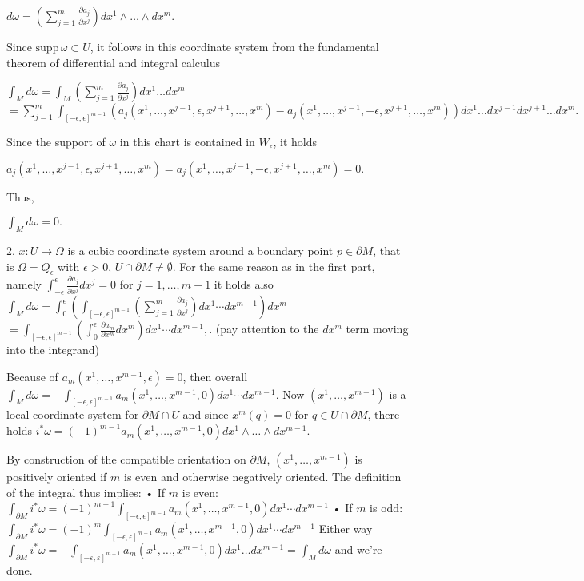 \(d\omega = \left( \sum_{j=1}^m \frac{\partial a_j}{\partial x^j} \right) dx^1 \wedge \dots \wedge dx^m. \)

Since \(\text{supp} \, \omega \subset U\), it follows in this coordinate system from the fundamental theorem of differential and integral calculus

\(\int_M d\omega = \int_M \left( \sum_{j=1}^m \frac{\partial a_j}{\partial x^j} \right) dx^1 \dots dx^m \)
\(= \sum_{j=1}^m \int_{[- \epsilon, \epsilon]^{m-1}} (a_j(x^1, \dots, x^{j-1}, \epsilon, x^{j+1}, \dots, x^m) - a_j(x^1, \dots, x^{j-1}, -\epsilon, x^{j+1}, \dots, x^m)) dx^1 \dots dx^{j-1} dx^{j+1} \dots dx^m. \)

Since the support of \(\omega\) in this chart is contained in \(W_\epsilon\), it holds

\(a_j(x^1, \dots, x^{j-1}, \epsilon, x^{j+1}, \dots, x^m) = a_j(x^1, \dots, x^{j-1}, -\epsilon, x^{j+1}, \dots, x^m) = 0.\)

Thus,

\(\int_M d\omega = 0.\)

2. 
\(x: U \to \Omega\) is a cubic coordinate system around a boundary point \(p \in \partial M\), 
that is \(\Omega = Q_\epsilon\) with \(\epsilon > 0\), \(U \cap \partial M \neq \emptyset\). 
For the same reason as in the first part, namely
\(\int_{-\epsilon}^\epsilon \frac{\partial a_j}{\partial x^j} dx^j = 0\)
for \(j = 1, \dots, m-1\)
it holds also
\(\int_{M} d\omega = \int_0^\epsilon \left( \int_{[-\epsilon, \epsilon]^{m-1}} \left( \sum_{j=1}^m \frac{\partial a_j}{\partial x^j} \right) dx^1 \dotsm dx^{m-1} \right) dx^m \)
\(= \int_{[-\epsilon, \epsilon]^{m-1}} \left( \int_0^\epsilon \frac{\partial a_m}{\partial x^m} dx^m \right) dx^1 \dotsm dx^{m-1}, \).
(pay attention to the \(dx^m\) term moving into the integrand)


Because of \(a_m(x^1, \dots, x^{m-1}, \epsilon) = 0\), then overall
\(\int_M d\omega = -\int_{[-\epsilon, \epsilon]^{m-1}} a_m(x^1, \dots, x^{m-1}, 0) dx^1 \dotsm dx^{m-1}.\)
Now \((x^1, \dots, x^{m-1})\) is a local coordinate system for \(\partial M \cap U\) and since \(x^m(q) = 0\) for \(q \in U \cap \partial M\), there holds
\(i^* \omega = (-1)^{m-1} a_m (x^1, \dots, x^{m-1}, 0) dx^1 \wedge \dots \wedge dx^{m-1}.\)

By construction of the compatible orientation on \(\partial M\), \((x^1, \dots, x^{m-1})\) is positively oriented 
if \(m\) is even and otherwise negatively oriented. 
The definition of the integral thus implies:
• If \(m\) is even:
\(\int_{\partial M} i^* \omega = (-1)^{m-1} \int_{[-\epsilon, \epsilon]^{m-1}} a_m(x^1, \dots, x^{m-1}, 0) dx^1 \dotsm dx^{m-1}\)
• If \(m\) is odd:
\(\int_{\partial M} i^* \omega = (-1)^{m} \int_{[-\epsilon, \epsilon]^{m-1}} a_m(x^1, \dots, x^{m-1}, 0) dx^1 \dotsm dx^{m-1}\)
Either way
\( \int_{\partial M} i^\ast \omega = - \int_{[-\varepsilon, \varepsilon]^{m-1}} a_m(x^1, \dots, x^{m-1}, 0) dx^1 \dots dx^{m-1} = \int_M d\omega \)
and we're done.

